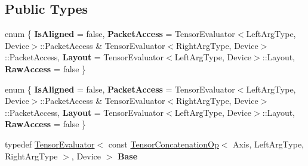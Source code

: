 \subsection*{Public Types}
\begin{DoxyCompactItemize}
\item 
\mbox{\label{struct_eigen_1_1_tensor_evaluator_3_01_tensor_concatenation_op_3_01_axis_00_01_left_arg_type_00_7f27325ca3102a6730769e76427d2ca7_a7df25a4fe6ce2986390339278d1a52c6}} 
enum \{ {\bfseries Is\+Aligned} = false, 
{\bfseries Packet\+Access} = Tensor\+Evaluator$<$Left\+Arg\+Type, Device$>$\+:\+:Packet\+Access \& Tensor\+Evaluator$<$Right\+Arg\+Type, Device$>$\+:\+:Packet\+Access, 
{\bfseries Layout} = Tensor\+Evaluator$<$Left\+Arg\+Type, Device$>$\+:\+:Layout, 
{\bfseries Raw\+Access} = false
 \}
\item 
\mbox{\label{struct_eigen_1_1_tensor_evaluator_3_01_tensor_concatenation_op_3_01_axis_00_01_left_arg_type_00_7f27325ca3102a6730769e76427d2ca7_a5ba685041e725cb429df17a1bd6852d1}} 
enum \{ {\bfseries Is\+Aligned} = false, 
{\bfseries Packet\+Access} = Tensor\+Evaluator$<$Left\+Arg\+Type, Device$>$\+:\+:Packet\+Access \& Tensor\+Evaluator$<$Right\+Arg\+Type, Device$>$\+:\+:Packet\+Access, 
{\bfseries Layout} = Tensor\+Evaluator$<$Left\+Arg\+Type, Device$>$\+:\+:Layout, 
{\bfseries Raw\+Access} = false
 \}
\item 
\mbox{\label{struct_eigen_1_1_tensor_evaluator_3_01_tensor_concatenation_op_3_01_axis_00_01_left_arg_type_00_7f27325ca3102a6730769e76427d2ca7_a946500fde4f730f43e45ebb4245256e1}} 
typedef \hyperlink{struct_eigen_1_1_tensor_evaluator}{Tensor\+Evaluator}$<$ const \hyperlink{class_eigen_1_1_tensor_concatenation_op}{Tensor\+Concatenation\+Op}$<$ Axis, Left\+Arg\+Type, Right\+Arg\+Type $>$, Device $>$ {\bfseries Base}
\item 
\mbox{\label{struct_eigen_1_1_tensor_evaluator_3_01_tensor_concatenation_op_3_01_axis_00_01_left_arg_type_00_7f27325ca3102a6730769e76427d2ca7_a1af9bec79cdd42d840983f2078ac88ae}} 

\end{DoxyCompactItemize}
